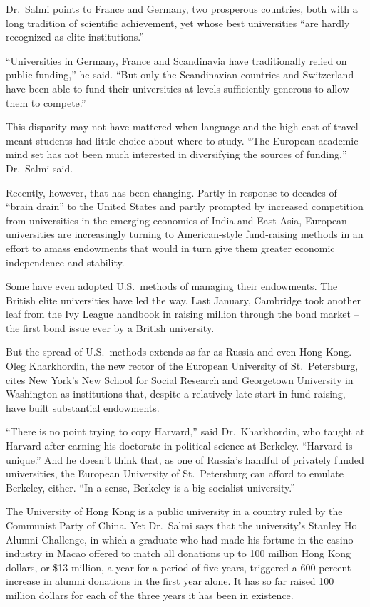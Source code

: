 ﻿\documentclass[12pt]{article}
\begin{document}
Dr.~Salmi points to France and Germany, two prosperous countries, both with a long tradition of
scientific achievement, yet whose best universities ``are hardly recognized as elite institutions.''

``Universities in Germany, France and Scandinavia have traditionally relied on public funding,'' he
said. ``But only the Scandinavian countries and Switzerland have been able to fund their
universities at levels sufficiently generous to allow them to compete.''

This disparity may not have mattered when language and the high cost of travel meant students had
little choice about where to study. ``The European academic mind set has not been much interested in
diversifying the sources of funding,'' Dr.~Salmi said.

Recently, however, that has been changing. Partly in response to decades of ``brain drain'' to the
United States and partly prompted by increased competition from universities in the emerging
economies of India and East Asia, European universities are increasingly turning to American-style
fund-raising methods in an effort to amass endowments that would in turn give them greater economic
independence and stability.

Some have even adopted U.S.~methods of managing their endowments. The British elite universities
have led the way. Last January, Cambridge took another leaf from the Ivy League handbook in raising
 million through the bond market -- the first bond issue ever by a British
university.

But the spread of U.S.~methods extends as far as Russia and even Hong Kong. Oleg Kharkhordin, the
new rector of the European University of St.~Petersburg, cites New York's New School for Social
Research and Georgetown University in Washington as institutions that, despite a relatively late
start in fund-raising, have built substantial endowments.

``There is no point trying to copy Harvard,'' said Dr.~Kharkhordin, who taught at Harvard after
earning his doctorate in political science at Berkeley. ``Harvard is unique.'' And he doesn't think
that, as one of Russia's handful of privately funded universities, the European University of
St.~Petersburg can afford to emulate Berkeley, either. ``In a sense, Berkeley is a big socialist
university.''

The University of Hong Kong is a public university in a country ruled by the Communist Party of
China. Yet Dr.~Salmi says that the university's Stanley Ho Alumni Challenge, in which a graduate who
had made his fortune in the casino industry in Macao offered to match all donations up to 100
million Hong Kong dollars, or \$13 million, a year for a period of five years, triggered a 600
percent increase in alumni donations in the first year alone. It has so far raised 100 million
dollars for each of the three years it has been in existence.
\end{document}
